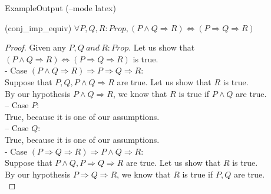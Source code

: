 \documentclass[pdf]{beamer}
\begin{document}
\begin{frame}{Example}{Output (--mode latex)}
    \begin{lemma} (conj\_imp\_equiv) $\forall P, Q, R : Prop, (P \land Q \Rightarrow R) \Leftrightarrow (P \Rightarrow Q \Rightarrow R)$
    \end{lemma}
    \begin{proof}\scriptsize
        Given any $P, Q~and~R : Prop$. Let us show that $(P \land Q \Rightarrow R) \Leftrightarrow (P \Rightarrow Q \Rightarrow R)$ is true.\\
\hspace{5mm}- Case $(P \land Q \Rightarrow R) \Rightarrow P \Rightarrow Q \Rightarrow R$:\\
\hspace{5mm}\hspace{5mm}Suppose that $P, Q, P \land Q \Rightarrow R$ are true. Let us show that $R$ is true.\\
\hspace{5mm}\hspace{5mm}By our hypothesis $P \land Q \Rightarrow R$, we know that $R$ is true if $P \land Q$ are true.\\
\hspace{5mm}\hspace{5mm}-- Case $P$:\\
\hspace{5mm}\hspace{5mm}\hspace{5mm}True, because it is one of our assumptions.\\
\hspace{5mm}\hspace{5mm}-- Case $Q$:\\
\hspace{5mm}\hspace{5mm}\hspace{5mm}True, because it is one of our assumptions.\\
\hspace{5mm}- Case $(P \Rightarrow Q \Rightarrow R) \Rightarrow P \land Q \Rightarrow R$:\\
\hspace{5mm}\hspace{5mm}Suppose that $P \land Q, P \Rightarrow Q \Rightarrow R$ are true. Let us show that $R$ is true.\\
\hspace{5mm}\hspace{5mm}By our hypothesis $P \Rightarrow Q \Rightarrow R$, we know that $R$ is true if $P, Q$ are true.\\

\end{proof}
\end{frame}
\end{document}
